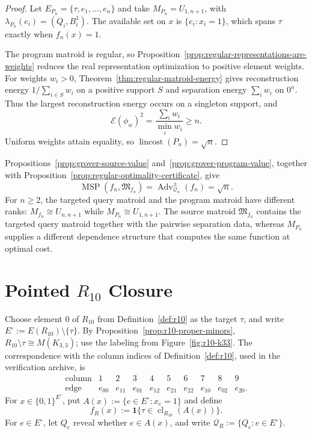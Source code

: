 \documentclass[11pt]{article}
\numberwithin{equation}{section}
\theoremstyle{remark}
\newcommand{\cl}{\operatorname{cl}}
\begin{document}
\begin{proof}
Let $E_{P_n}=\{\tau,e_1,\ldots,e_n\}$ and take
$M_{P_n}=U_{1,n+1}$, with $\lambda_{P_n}(e_i)=(Q_i,B_i^1)$. The available
set on $x$ is $\{e_i:x_i=1\}$, which spans $\tau$ exactly when
$f_n(x)=1$.

The program matroid is regular, so
Proposition~\ref{prop:regular-representations-are-weights} reduces the real
representation optimization to positive element weights. For weights
$w_i>0$, Theorem~\ref{thm:regular-matroid-energy} gives reconstruction energy
$1/\sum_{i\in S}w_i$ on a positive support $S$ and separation energy
$\sum_iw_i$ on $0^n$. Thus the largest reconstruction energy occurs on a
singleton support, and
\begin{equation}
    \mathcal E(\phi_w)^2
    =\frac{\sum_iw_i}{\min_iw_i}\geq n.
\end{equation}
Uniform weights attain equality, so
$\operatorname{lincost}(P_n)=\sqrt n$.
\end{proof}

Propositions~\ref{prop:grover-source-value} and~\ref{prop:grover-program-value},
together with Proposition~\ref{prop:regular-optimality-certificate}, give
\begin{equation}
    \operatorname{MSP}(f_n,\mathfrak M_{f_n})
    =\operatorname{Adv}^{\pm}_{\mathcal Q_n}(f_n)
    =\sqrt n.
\end{equation}
For $n\geq2$, the targeted query matroid and the program matroid have
different ranks:
$M_{f_n}\cong U_{n,n+1}$ while $M_{P_n}\cong U_{1,n+1}$. The source matroid
$\mathfrak M_{f_n}$ contains the targeted query matroid together with the
pairwise separation data, whereas $M_{P_n}$ supplies a different dependence
structure that computes the same function at optimal cost.

\section{Pointed \texorpdfstring{$R_{10}$}{R10} Closure}
\label{sec:r10-pointed}
\label{subsec:r10-pointed}

Choose element $0$ of $R_{10}$ from Definition~\ref{def:r10} as the target
$\tau$, and write $E^\circ:=E(R_{10})\setminus\{\tau\}$. By
Proposition~\ref{prop:r10-proper-minors},
$R_{10}\setminus\tau\cong M(K_{3,3})$; use the labeling from
Figure~\ref{fig:r10-k33}. The correspondence with the column indices of
Definition~\ref{def:r10}, used in the verification archive, is
\[
\begin{array}{c|rrrrrrrrr}
\text{column}&1&2&3&4&5&6&7&8&9\\ \hline
\text{edge}&e_{00}&e_{11}&e_{01}&e_{12}&e_{21}&e_{22}&e_{10}&e_{02}&e_{20}.
\end{array}
\]
For $x\in\{0,1\}^{E^\circ}$, put
$A(x):=\{e\in E^\circ:x_e=1\}$ and define
\begin{equation}
    f_R(x):=\mathbf 1\{\tau\in\cl_{R_{10}}(A(x))\}.
\end{equation}
For $e\in E^\circ$, let $Q_e$ reveal whether $e\in A(x)$, and write
$\mathcal Q_R:=\{Q_e:e\in E^\circ\}$.
\end{document}
